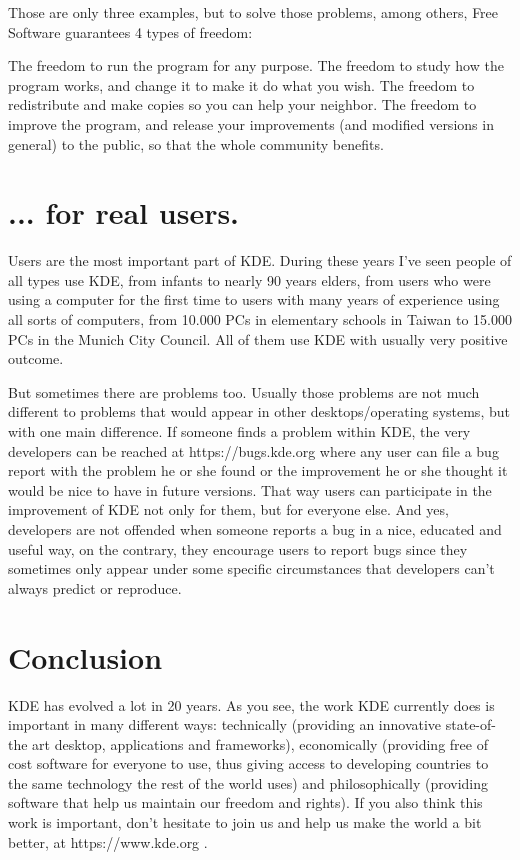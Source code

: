 Those are only three examples, but to solve those problems, among others, Free Software guarantees 4 types of freedom:

The freedom to run the program for any purpose.
The freedom to study how the program works, and change it to make it do what you wish.
The freedom to redistribute and make copies so you can help your neighbor.
The freedom to improve the program, and release your improvements (and modified versions in general) to the public, so that the whole community benefits.

\section*{... for real users.}

Users are the most important part of KDE. During these years I’ve seen people of all types use KDE, from infants to nearly 90 years elders, from users who were using a computer for the first time to users with many years of experience using all sorts of computers, from 10.000 PCs in elementary schools in Taiwan to 15.000 PCs in the Munich City Council. All of them use KDE with usually very positive outcome.

But sometimes there are problems too. Usually those problems are not much different to problems that would appear in other desktops/operating systems, but with one main difference. If someone finds a problem within KDE, the very developers can be reached at https://bugs.kde.org where any user can file a bug report with the problem he or she found or the improvement he or she thought it would be nice to have in future versions. That way users can participate in the improvement of KDE not only for them, but for everyone else. And yes, developers are not offended when someone reports a bug in a nice, educated and useful way, on the contrary, they encourage users to report bugs since they sometimes only appear under some specific circumstances that developers can’t always predict or reproduce.

\section*{Conclusion}
KDE has evolved a lot in 20 years. As you see, the work KDE currently does is important in many different ways: technically (providing an innovative state-of-the art desktop, applications and frameworks), economically (providing free of cost software for everyone to use, thus giving access to developing countries to the same technology the rest of the world uses) and philosophically (providing software that help us maintain our freedom and rights). If you also think this work is important, don’t hesitate to join us and help us make the world a bit better, at https://www.kde.org .